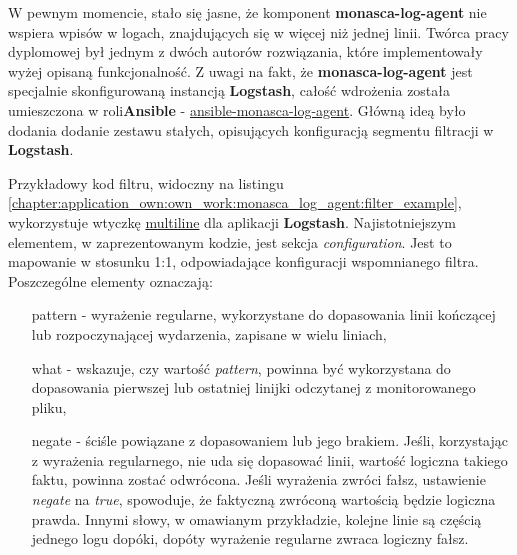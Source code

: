 W pewnym momencie, stało się jasne, że komponent \textbf{monasca-log-agent} nie wspiera wpisów w logach, znajdujących się w więcej
niż jednej linii. Twórca pracy dyplomowej był jednym z dwóch autorów rozwiązania, które implementowały wyżej opisaną funkcjonalność.
Z uwagi na fakt, że \textbf{monasca-log-agent} jest specjalnie skonfigurowaną instancją \textbf{Logstash}, całość wdrożenia została
umieszczona w roli\textbf{Ansible} - \href{https://github.com/FujitsuEnablingSoftwareTechnologyGmbH/ansible-monasca-log-agent}{ansible-monasca-log-agent}.
Główną ideą było dodania dodanie zestawu stałych, opisujących konfiguracją segmentu filtracji w \textbf{Logstash}.

Przykładowy kod filtru, widoczny na listingu \ref{chapter:application_own:own_work:monasca_log_agent:filter_example}, wykorzystuje wtyczkę
\href{https://www.elastic.co/guide/en/logstash/current/plugins-filters-multiline.html}{multiline} dla aplikacji \textbf{Logstash}.
Najistotniejszym elementem, w zaprezentowanym kodzie, jest sekcja \textit{configuration}. Jest to mapowanie w stosunku 1:1, odpowiadające
konfiguracji wspomnianego filtra. Poszczególne elementy oznaczają:
\begin{itemize}
    \item[pattern] - wyrażenie regularne, wykorzystane do dopasowania linii kończącej lub rozpoczynającej wydarzenia, zapisane w wielu liniach,
    \item[what] - wskazuje, czy wartość \textit{pattern}, powinna być wykorzystana do dopasowania pierwszej lub ostatniej linijki odczytanej
    z monitorowanego pliku,
    \item[negate] - ściśle powiązane z dopasowaniem lub jego brakiem. Jeśli, korzystając z wyrażenia regularnego, nie uda się dopasować linii,
    wartość logiczna takiego faktu, powinna zostać odwrócona. Jeśli wyrażenia zwróci fałsz, ustawienie \textit{negate} na \textit{true}, 
    spowoduje, że faktyczną zwróconą wartością będzie logiczna prawda. Innymi słowy, w omawianym przykładzie, kolejne linie są częścią jednego
    logu dopóki, dopóty wyrażenie regularne zwraca logiczny fałsz. 
\end{itemize}


